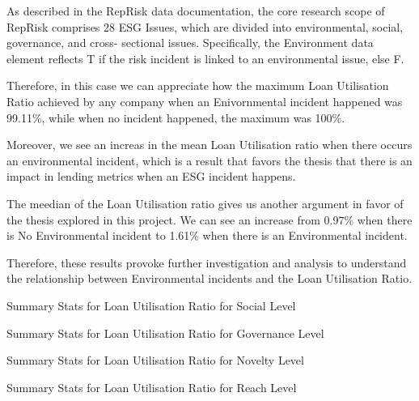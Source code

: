 As described in the RepRisk data documentation, the core research scope of RepRisk comprises 28 ESG Issues, which are divided into environmental, social, governance, and cross- sectional issues. Specifically, the Environment data element reflects T if the risk incident is linked to an environmental issue, else F.

Therefore, in this case we can appreciate how the maximum Loan Utilisation Ratio achieved by any company when an Enivornmental incident happened was 99.11\%, while when no incident happened, the maximum was 100\%.

Moreover, we see an increas in the mean Loan Utilisation ratio when there occurs an environmental incident, which is a result that favors the thesis that there is an impact in lending metrics when an ESG incident happens.

The meedian of the Loan Utilisation ratio gives us another argument in favor of the thesis explored in this project. We can see an increase from 0.97\% when there is No Environmental incident to 1.61\% when there is an Environmental incident.

Therefore, these results provoke further investigation and analysis to understand the relationship between Environmental incidents and the Loan Utilisation Ratio.

\begin{table}[H]
\caption{Summary Stats for Loan Utilisation Ratio for Social Level}
\centering
\resizebox{\textwidth}{!}{

}
\label{table:loan_utilisation_ratio_social.tex}
\end{table}

\begin{table}[H]
\caption{Summary Stats for Loan Utilisation Ratio for Governance Level}
\centering
\resizebox{\textwidth}{!}{

}
\label{table:loan_utilisation_ratio_governance.tex}
\end{table}


\begin{table}[H]
\caption{Summary Stats for Loan Utilisation Ratio for Novelty Level}
\centering
\resizebox{\textwidth}{!}{

}
\label{table:loan_utilisation_ratio_novelty.tex}
\end{table}

\begin{table}[H]
\caption{Summary Stats for Loan Utilisation Ratio for Reach Level}
\centering
\resizebox{\textwidth}{!}{

}
\label{table:loan_utilisation_ratio_reach.tex}
\end{table}

